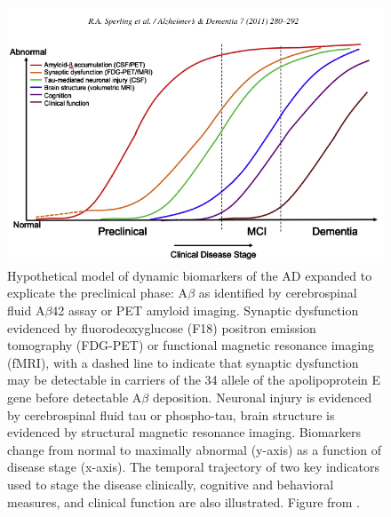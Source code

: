 \begin{figure}[H]
\begin{center}
\includegraphics[width=\linewidth]{../figures/ad_progression.png}
\end{center}
\caption[Biomarker model of Alzeimer's disease]
{Hypothetical model of dynamic biomarkers of the AD expanded to explicate the preclinical phase: A$\beta$ as identified by cerebrospinal fluid A$\beta$42 assay or PET amyloid imaging. Synaptic dysfunction evidenced by fluorodeoxyglucose (F18) positron emission tomography (FDG-PET) or functional magnetic resonance imaging (fMRI), with a dashed line to indicate that synaptic dysfunction may be detectable in carriers of the 34 allele of the apolipoprotein E gene before detectable A$\beta$ deposition. Neuronal injury is evidenced by cerebrospinal fluid tau or phospho-tau, brain structure is evidenced by structural magnetic resonance imaging. Biomarkers change from normal to maximally abnormal (y-axis) as a function of disease stage (x-axis). The temporal trajectory of two key indicators used to stage the disease clinically, cognitive and behavioral measures, and clinical function are also illustrated. Figure from \cite{Sperling2011}.}
\label{fig_biomarker_model}
\end{figure}


